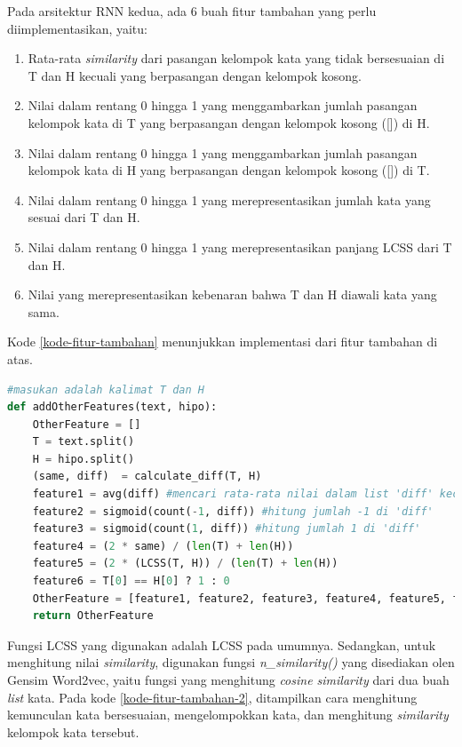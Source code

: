 Pada arsitektur RNN kedua, ada 6 buah fitur tambahan yang perlu diimplementasikan, yaitu:
\begin{enumerate}	
	\item Rata-rata \textit{similarity} dari pasangan kelompok kata yang tidak bersesuaian di T dan H kecuali yang berpasangan dengan kelompok kosong. 		
	\item Nilai dalam rentang 0 hingga 1 yang menggambarkan jumlah pasangan kelompok kata di T yang berpasangan dengan kelompok kosong ([]) di H.
	\item Nilai dalam rentang 0 hingga 1 yang menggambarkan jumlah pasangan kelompok kata di H yang berpasangan dengan kelompok kosong ([]) di T. 
	\item Nilai dalam rentang 0 hingga 1 yang merepresentasikan jumlah kata yang sesuai dari T dan H. 
	\item Nilai dalam rentang 0 hingga 1 yang merepresentasikan panjang LCSS dari T dan H. 
	\item Nilai yang merepresentasikan kebenaran bahwa T dan H diawali kata yang sama. 
\end{enumerate}	
Kode \ref{kode-fitur-tambahan} menunjukkan implementasi dari fitur tambahan di atas. 
\begin{lstlisting}[language=Python, caption={Penambahan fitur arsitektur RNN kedua}, label={kode-fitur-tambahan}]
#masukan adalah kalimat T dan H
def addOtherFeatures(text, hipo):
	OtherFeature = []
	T = text.split()
	H = hipo.split()		
	(same, diff)  = calculate_diff(T, H)
	feature1 = avg(diff) #mencari rata-rata nilai dalam list 'diff' kecuali yang bernilai 1 dan -1
	feature2 = sigmoid(count(-1, diff)) #hitung jumlah -1 di 'diff'
	feature3 = sigmoid(count(1, diff)) #hitung jumlah 1 di 'diff'
	feature4 = (2 * same) / (len(T) + len(H))
	feature5 = (2 * (LCSS(T, H)) / (len(T) + len(H))	
	feature6 = T[0] == H[0] ? 1 : 0
	OtherFeature = [feature1, feature2, feature3, feature4, feature5, feature6]
	return OtherFeature
\end{lstlisting}
\noindent Fungsi LCSS yang digunakan adalah LCSS pada umumnya. Sedangkan,  untuk menghitung nilai \textit{similarity}, digunakan fungsi \textit{n\_similarity()} yang disediakan olen Gensim Word2vec, yaitu fungsi yang menghitung \textit{cosine similarity} dari dua buah \textit{list} kata. Pada kode \ref{kode-fitur-tambahan-2}, ditampilkan cara menghitung kemunculan kata bersesuaian, mengelompokkan kata, dan menghitung \textit{similarity} kelompok kata tersebut.

